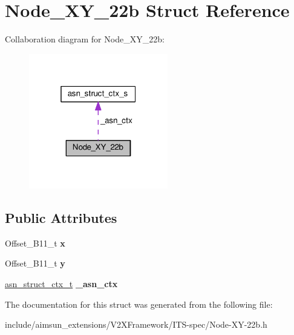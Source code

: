 \hypertarget{structNode__XY__22b}{}\section{Node\+\_\+\+X\+Y\+\_\+22b Struct Reference}
\label{structNode__XY__22b}


Collaboration diagram for Node\+\_\+\+X\+Y\+\_\+22b\+:\nopagebreak
\begin{figure}[H]
\begin{center}
\leavevmode
\includegraphics[width=172pt]{structNode__XY__22b__coll__graph}
\end{center}
\end{figure}
\subsection*{Public Attributes}
\begin{DoxyCompactItemize}
\item 
Offset\+\_\+\+B11\+\_\+t {\bfseries x}\hypertarget{structNode__XY__22b_a1e2f3bdd16457368c39162b99b26c1e6}{}\label{structNode__XY__22b_a1e2f3bdd16457368c39162b99b26c1e6}

\item 
Offset\+\_\+\+B11\+\_\+t {\bfseries y}\hypertarget{structNode__XY__22b_a9e26cf62ce43a2be4f5a10d94f165146}{}\label{structNode__XY__22b_a9e26cf62ce43a2be4f5a10d94f165146}

\item 
\hyperlink{structasn__struct__ctx__s}{asn\+\_\+struct\+\_\+ctx\+\_\+t} {\bfseries \+\_\+asn\+\_\+ctx}\hypertarget{structNode__XY__22b_a68dc8599f1cf2274f8b5d9a8c4f874f2}{}\label{structNode__XY__22b_a68dc8599f1cf2274f8b5d9a8c4f874f2}

\end{DoxyCompactItemize}


The documentation for this struct was generated from the following file\+:\begin{DoxyCompactItemize}
\item 
include/aimsun\+\_\+extensions/\+V2\+X\+Framework/\+I\+T\+S-\/spec/Node-\/\+X\+Y-\/22b.\+h\end{DoxyCompactItemize}
